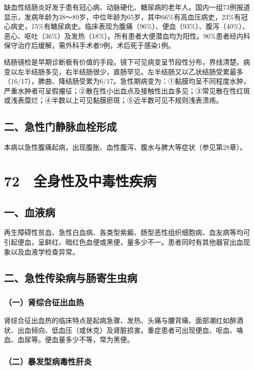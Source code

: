 缺血性结肠炎好发于患有冠心病、动脉硬化、糖尿病的老年人。国内一组73例报道显示，发病年龄为38～89岁，中位年龄为65岁，其中66\%有高血压病史，23\%有冠心病史，15\%有糖尿病史。临床表现为腹痛（96\%）、便血（93\%）、腹泻（40\%）、恶心、呕吐（36\%）及发热（18\%）。所有患者大便潜血均为阳性。96\%患者经内科保守治疗后缓解，需外科手术者9例，术后死于感染1例。

结肠镜检是早期诊断极有价值的手段。镜下可见病变呈节段性分布，界线清楚。病变以左半结肠多见，右半结肠很少，直肠罕见。左半结肠又以乙状结肠受累最多（16/17），脾曲、降结肠受累为6/17。急性期病变为：①黏膜均呈不同程度水肿，严重水肿者可呈假瘤征；②散在性小出血点及接触性出血多见；③常见散在性红斑或浅表糜烂；④半数以上可见黏膜瘀斑；⑤近半数可见不规则浅表溃疡。

\subsection{二、急性门静脉血栓形成}

本病以急性腹痛起病，出现腹胀、血性腹泻、腹水与脾大等症状（参见第28章）。

\protect\hypertarget{text00180.html}{}{}

\section{72　全身性及中毒性疾病}

\subsection{一、血液病}

再生障碍性贫血、急性白血病、各类型紫癜、肠型恶性组织细胞病、血友病等均可引起便血，呈鲜红、暗红色血便或黑便，量多少不一。患者同时有其他器官出血现象以及血液学检查异常。

\subsection{二、急性传染病与肠寄生虫病}

\subsubsection{（一）肾综合征出血热}

肾综合征出血热的临床特点是起病急骤、发热、头痛与腰背痛、面部潮红如醉酒状、出血倾向、低血压（或休克）及肾脏损害。重症患者可出现便血、呕血、咯血、血尿等。便血量多少不等，常为黑便。

\subsubsection{（二）暴发型病毒性肝炎}

